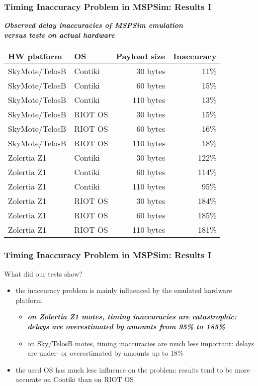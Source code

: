 \documentclass[10pt,c]{beamer}
\renewcommand{\emph}[1]{\textbf{\textit{#1}}}
\newcommand{\tblcaption}[1]{\textbf{\textsl{\small#1}}\vspace{0.1cm}}
\begin{document}
\begin{frame}
\frametitle{Timing Inaccuracy Problem in MSPSim: Results I}
\begin{center}
\tblcaption{Observed delay inaccuracies of MSPSim emulation \\
            versus tests on actual hardware}

\begin{tabular}{|l|l|r|r|}
\hline
\textbf{HW platform} & \textbf{OS} & \textbf{Payload size}
                     & \textbf{Inaccuracy} \\
\hline
SkyMote/TelosB & Contiki &  30 bytes &  11\% \\
SkyMote/TelosB & Contiki &  60 bytes &  15\% \\
SkyMote/TelosB & Contiki & 110 bytes &  13\% \\
\hline
SkyMote/TelosB & RIOT OS &  30 bytes &  15\% \\
SkyMote/TelosB & RIOT OS &  60 bytes &  16\% \\
SkyMote/TelosB & RIOT OS & 110 bytes &  18\% \\
\hline
Zolertia Z1    & Contiki &  30 bytes & 122\% \\
Zolertia Z1    & Contiki &  60 bytes & 114\% \\
Zolertia Z1    & Contiki & 110 bytes &  95\% \\
\hline
Zolertia Z1    & RIOT OS &  30 bytes & 184\% \\
Zolertia Z1    & RIOT OS &  60 bytes & 185\% \\
Zolertia Z1    & RIOT OS & 110 bytes & 181\% \\
\hline
\end{tabular}
\end{center}
\end{frame}

\begin{frame}
\frametitle{Timing Inaccuracy Problem in MSPSim: Results I}
\begin{block}{What did our tests show?}
\begin{itemize}
\item the inaccuracy problem is mainly influenced by the emulated hardware
platform
  \begin{itemize}
  \item \emph{on Zolertia Z1 motes, timing inaccuracies are catastrophic:
  delays are overestimated by amounts from 95\% to 185\%}
  \item on Sky/TelosB motes, timing inaccuracies are much less important:
  delays are under- or overestimated by amounts up to 18\%
  \end{itemize}
\item the used OS has much less influence on the problem: results tend
to be more accurate on Contiki than on RIOT OS
\end{itemize}
\end{block}
\end{frame}
\end{document}
